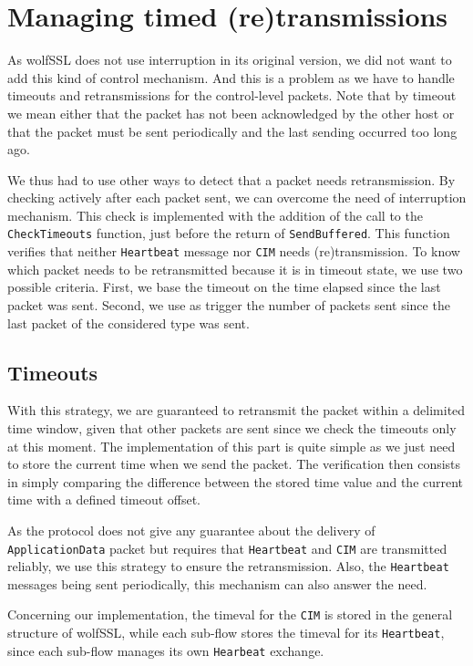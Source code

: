 \section{Managing timed (re)transmissions}

As wolfSSL does not use interruption in its original version, we did not want to add this kind of control mechanism. And this is a problem as we have to handle timeouts and retransmissions for the control-level packets. Note that by timeout we mean either that the packet has not been acknowledged by the other host or that the packet must be sent periodically and the last sending occurred too long ago.

We thus had to use other ways to detect that a packet needs retransmission. By checking actively after each packet sent, we can overcome the need of interruption mechanism. This check is implemented with the addition of the call to the \texttt{CheckTimeouts} function, just before the return of \texttt{SendBuffered}. This function verifies that neither \texttt{Heartbeat} message nor \texttt{CIM} needs (re)transmission. To know which packet needs to be retransmitted because it is in timeout state, we use two possible criteria. First, we base the timeout on the time elapsed since the last packet was sent. Second, we use as trigger the number of packets sent since the last packet of the considered type was sent.

\subsection{Timeouts}

With this strategy, we are guaranteed to retransmit the packet within a delimited time window, given that other packets are sent since we check the timeouts only at this moment. The implementation of this part is quite simple as we just need to store the current time when we send the packet. The verification then consists in simply comparing the difference between the stored time value and the current time with a defined timeout offset.

As the protocol does not give any guarantee about the delivery of \texttt{ApplicationData} packet but requires that \texttt{Heartbeat} and \texttt{CIM} are transmitted reliably, we use this strategy to ensure the retransmission. Also, the \texttt{Heartbeat} messages being sent periodically, this mechanism can also answer the need.

Concerning our implementation, the timeval for the \texttt{CIM} is stored in the general structure of wolfSSL, while each sub-flow stores the timeval for its \texttt{Heartbeat}, since each sub-flow manages its own \texttt{Hearbeat} exchange.


